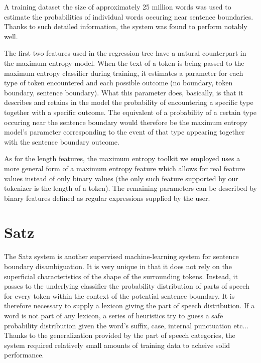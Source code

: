 A training dataset the size of approximately 25 million words was used to
estimate the probabilities of individual words occuring near sentence
boundaries. Thanks to such detailed information, the system was found to
perform notably well.

The first two features used in the regression tree have a natural counterpart
in the maximum entropy model. When the text of a token is being passed to the
maximum entropy classifier during training, it estimates a parameter for each
type of token encountered and each possible outcome (no boundary, token
boundary, sentence boundary). What this parameter does, basically, is that it
describes and retains in the model the probability of encountering a specific
type together with a specific outcome. The equivalent of a probability of a
certain type occuring near the sentence boundary would therefore be the
maximum entropy model's parameter corresponding to the event of that type
appearing together with the sentence boundary outcome.

As for the length features, the maximum entropy toolkit we employed uses a more
general form of a maximum entropy feature which allows for real feature values
instead of only binary values (the only such feature supported by our tokenizer
is the length of a token). The remaining parameters can be described by binary
features defined as regular expressions supplied by the user.

\section{Satz}
\label{sec:survey-satz}

The Satz system \cite{sbd-satz} is another supervised machine-learning system
for sentence boundary disambiguation. It is very unique in that it does not
rely on the superficial characteristics of the shape of the surrounding
tokens. Instead, it passes to the underlying classifier the probability
distribution of parts of speech for every token within the context of the
potential sentence boundary. It is therefore necessary to supply a lexicon
giving the part of speech distribution. If a word is not part of any lexicon,
a series of heuristics try to guess a safe probability distribution given the
word's suffix, case, internal punctuation etc... Thanks to the generalization
provided by the part of speech categories, the system required relatively
small amounts of training data to acheive solid performance. 

